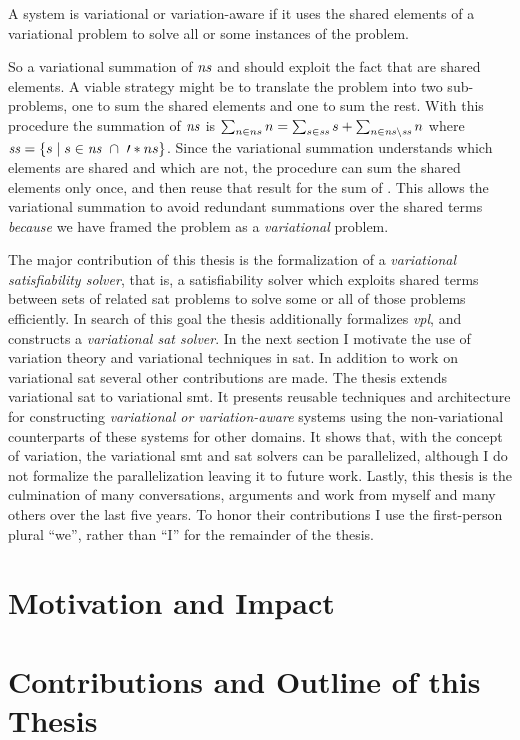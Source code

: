 \begin{definition}
  A system is variational or variation-aware if it uses the shared elements of a
  variational problem to solve all or some instances of the problem.
\end{definition}
%
So a variational summation of $\mathit{ns}$ and  should exploit the fact
that  are shared elements. A viable strategy might be to translate
the problem into two sub-problems, one to sum the shared elements and one to sum
the rest. With this procedure the summation of $\mathit{ns}$ is $\sum_{n \in{} ns} n
= \sum_{s \in{} \mathit{ss}} s + \sum_{n \in{} \mathit{ns} \setminus{} \mathit{ss}} n$ where
$\kf{ss} = \setc{s}{s \in{} \kf{ns}\ \cap{}\ \prime*{ns}}$. Since the
variational summation understands which elements are shared and which are not,
the procedure can sum the shared elements only once, and then reuse that result
for the sum of . This allows the variational summation to avoid
redundant summations over the shared terms \emph{because} we have framed the
problem as a \emph{variational} problem.

The major contribution of this thesis is the formalization of a
\emph{variational satisfiability solver}, that is, a satisfiability solver which
exploits shared terms between sets of related \acl{sat} problems to solve some
or all of those problems efficiently. In search of this goal the thesis
additionally formalizes \emph{\acl{vpl}}, and constructs a \emph{variational
  \ac{sat} solver}. In the next section I motivate the use of variation theory
and variational techniques in \acl{sat}. In addition to work on variational
\ac{sat} several other contributions are made. The thesis extends variational
\acl{sat} to variational \ac{smt}. It presents reusable techniques and
architecture for constructing \emph{variational or variation-aware} systems
using the non-variational counterparts of these systems for other domains. It
shows that, with the concept of variation, the variational \ac{smt} and \ac{sat}
solvers can be parallelized, although I do not formalize the parallelization
leaving it to future work. Lastly, this thesis is the culmination of many
conversations, arguments and work from myself and many others over the last five
years. To honor their contributions I use the first-person plural ``we'', rather
than ``I'' for the remainder of the thesis.

\section{Motivation and Impact}


\section{Contributions and Outline of this Thesis}


